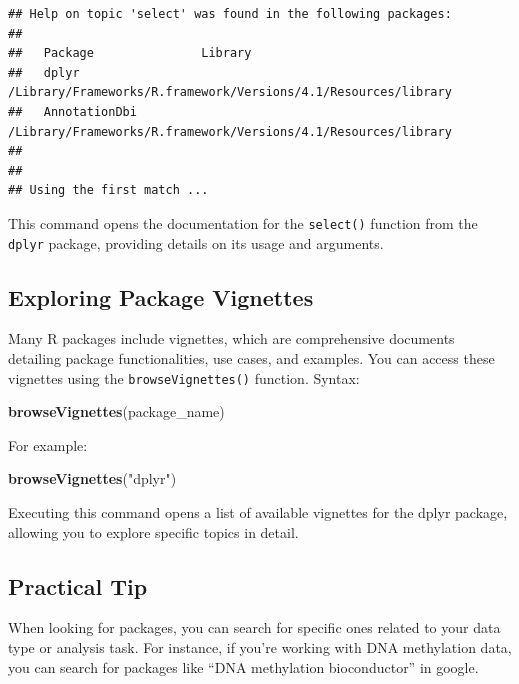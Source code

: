 \documentclass[
]{book}
\newenvironment{Shaded}{\begin{snugshade}}{\end{snugshade}}
\newcommand{\FunctionTok}[1]{\textcolor[rgb]{0.13,0.29,0.53}{\textbf{#1}}}
\newcommand{\NormalTok}[1]{#1}
\newcommand{\StringTok}[1]{\textcolor[rgb]{0.31,0.60,0.02}{#1}}
\begin{document}
\begin{verbatim}
## Help on topic 'select' was found in the following packages:
## 
##   Package               Library
##   dplyr                 /Library/Frameworks/R.framework/Versions/4.1/Resources/library
##   AnnotationDbi         /Library/Frameworks/R.framework/Versions/4.1/Resources/library
## 
## 
## Using the first match ...
\end{verbatim}

This command opens the documentation for the \texttt{select()} function from the \texttt{dplyr} package, providing details on its usage and arguments.

\hypertarget{exploring-package-vignettes}{%
\subsection{Exploring Package Vignettes}\label{exploring-package-vignettes}}

Many R packages include vignettes, which are comprehensive documents detailing package functionalities, use cases, and examples. You can access these vignettes using the \texttt{browseVignettes()} function. Syntax:

\begin{Shaded}
\begin{Highlighting}[]
\FunctionTok{browseVignettes}\NormalTok{(package\_name)}
\end{Highlighting}
\end{Shaded}

For example:

\begin{Shaded}
\begin{Highlighting}[]
\FunctionTok{browseVignettes}\NormalTok{(}\StringTok{"dplyr"}\NormalTok{)}
\end{Highlighting}
\end{Shaded}

Executing this command opens a list of available vignettes for the dplyr package, allowing you to explore specific topics in detail.

\hypertarget{practical-tip}{%
\subsection{Practical Tip}\label{practical-tip}}

When looking for packages, you can search for specific ones related to your data type or analysis task. For instance, if you're working with DNA methylation data, you can search for packages like ``DNA methylation bioconductor'' in google.
\end{document}
